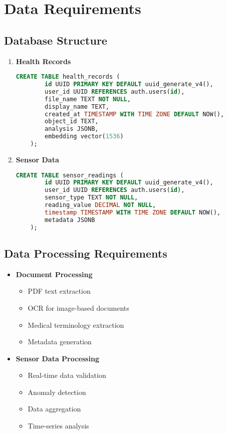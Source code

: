 \section{Data Requirements}
\subsection{Database Structure}
\begin{enumerate}
    \item \textbf{Health Records}
    \begin{lstlisting}[language=sql]
    CREATE TABLE health_records (
        id UUID PRIMARY KEY DEFAULT uuid_generate_v4(),
        user_id UUID REFERENCES auth.users(id),
        file_name TEXT NOT NULL,
        display_name TEXT,
        created_at TIMESTAMP WITH TIME ZONE DEFAULT NOW(),
        object_id TEXT,
        analysis JSONB,
        embedding vector(1536)
    );
    \end{lstlisting}

    \item \textbf{Sensor Data}
    \begin{lstlisting}[language=sql]
    CREATE TABLE sensor_readings (
        id UUID PRIMARY KEY DEFAULT uuid_generate_v4(),
        user_id UUID REFERENCES auth.users(id),
        sensor_type TEXT NOT NULL,
        reading_value DECIMAL NOT NULL,
        timestamp TIMESTAMP WITH TIME ZONE DEFAULT NOW(),
        metadata JSONB
    );
    \end{lstlisting}
\end{enumerate}

\subsection{Data Processing Requirements}
\begin{itemize}
    \item \textbf{Document Processing}
    \begin{itemize}
        \item PDF text extraction
        \item OCR for image-based documents
        \item Medical terminology extraction
        \item Metadata generation
    \end{itemize}

    \item \textbf{Sensor Data Processing}
    \begin{itemize}
        \item Real-time data validation
        \item Anomaly detection
        \item Data aggregation
        \item Time-series analysis
    \end{itemize}
\end{itemize} 